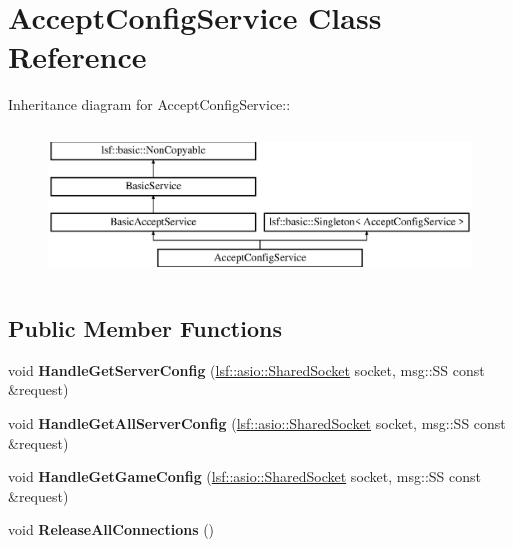 \hypertarget{classAcceptConfigService}{
\section{AcceptConfigService Class Reference}
\label{classAcceptConfigService}
}
Inheritance diagram for AcceptConfigService::\begin{figure}[H]
\begin{center}
\leavevmode
\includegraphics[height=4cm]{classAcceptConfigService}
\end{center}
\end{figure}
\subsection*{Public Member Functions}
\begin{DoxyCompactItemize}
\item 
\hypertarget{classAcceptConfigService_a52b09d9a845710b3be554b90f71bdfb7}{
void {\bfseries HandleGetServerConfig} (\hyperlink{classlsf_1_1asio_1_1SharedSocket}{lsf::asio::SharedSocket} socket, msg::SS const \&request)}
\label{classAcceptConfigService_a52b09d9a845710b3be554b90f71bdfb7}

\item 
\hypertarget{classAcceptConfigService_a3897aedae87f3e9c44b85d23047c09d0}{
void {\bfseries HandleGetAllServerConfig} (\hyperlink{classlsf_1_1asio_1_1SharedSocket}{lsf::asio::SharedSocket} socket, msg::SS const \&request)}
\label{classAcceptConfigService_a3897aedae87f3e9c44b85d23047c09d0}

\item 
\hypertarget{classAcceptConfigService_a262d5b3e65b4542215dd3e2d8a1984e7}{
void {\bfseries HandleGetGameConfig} (\hyperlink{classlsf_1_1asio_1_1SharedSocket}{lsf::asio::SharedSocket} socket, msg::SS const \&request)}
\label{classAcceptConfigService_a262d5b3e65b4542215dd3e2d8a1984e7}

\item 
\hypertarget{classAcceptConfigService_a299aa25cb34e3406f2bf3b378589d9db}{
void {\bfseries ReleaseAllConnections} ()}
\label{classAcceptConfigService_a299aa25cb34e3406f2bf3b378589d9db}

\end{DoxyCompactItemize}
